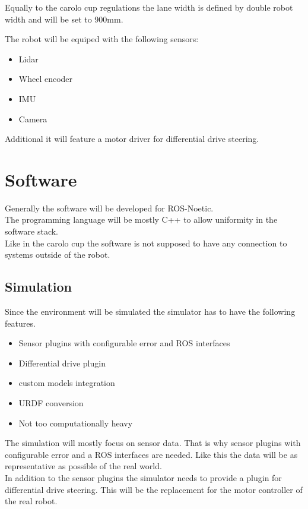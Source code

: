 Equally to the carolo cup regulations the lane width is defined by double robot width and will be set to 900mm. 

The robot will be equiped with the following sensors:

\begin{itemize}
	\item Lidar
	\item Wheel encoder
	\item IMU
	\item Camera
\end{itemize}

Additional it will feature a motor driver for differential drive steering.

\section{Software}
Generally the software will be developed for ROS-Noetic.\\
The programming language will be mostly C++ to allow uniformity in the software stack.\\
Like in the carolo cup the software is not supposed to have any connection to systems outside of the robot.\\

\subsection{Simulation}
Since the environment will be simulated the simulator has to have the following features.
\begin{itemize}
	\item Sensor plugins with configurable error and ROS interfaces
	\item Differential drive plugin
	\item custom models integration
	\item URDF conversion
	\item Not too computationally heavy
\end{itemize}

The simulation will mostly focus on sensor data. That is why sensor plugins with configurable error and a ROS interfaces are needed. Like this the data will be as representative as possible of the real world.\\

In addition to the sensor plugins the simulator needs to provide a plugin for differential drive steering. This will be the replacement for the motor controller of the real robot.\\

